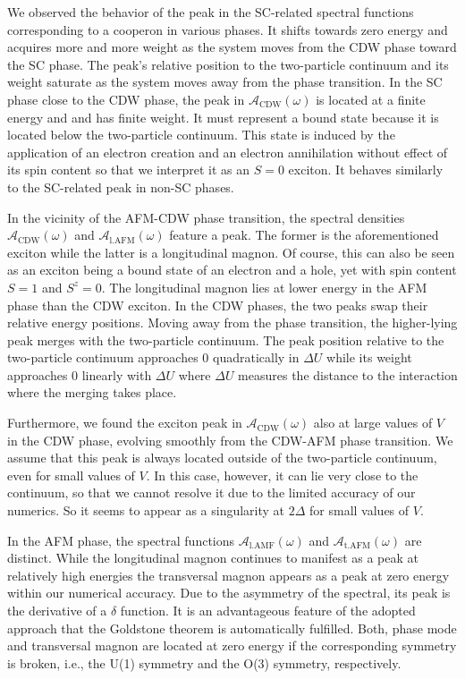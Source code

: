 \documentclass[
    reprint, 
    aps,
    preprintnumbers,
    twocolumn,
    prb,
    superscriptaddress
]{revtex4-2}
\newcommand{\spectral}[1]{\mathcal{A}_\text{#1}  (\omega)}
\begin{document}
We observed the behavior of the peak in the SC-related spectral functions corresponding to a cooperon in various phases. 
It shifts towards zero energy and acquires more and more weight as the system moves from the CDW phase toward the SC phase. 
The peak's relative position to the two-particle continuum and its weight saturate 
as the system moves away from the phase transition.
In the SC phase close to the CDW phase, the peak in $\spectral{CDW}$ 
is located at a finite energy and and has finite weight. 
It must represent a bound state because it is located below the two-particle continuum. 
This state is induced by the application of an electron creation and an electron annihilation without effect of its spin content so that we interpret it as an $S=0$ exciton.
It behaves similarly to the SC-related peak in non-SC phases.

In the vicinity of the AFM-CDW phase transition, the spectral densities
$\spectral{CDW}$ and $\spectral{l.AFM}$ feature a peak. 
The former is the aforementioned exciton while the latter is a longitudinal magnon. 
Of course, this can also be seen as an exciton being a bound
state of an electron and a hole, yet with spin content $S=1$ and $S^z=0$. 
The longitudinal magnon lies at lower energy in the AFM phase than the CDW exciton. 
In the CDW phases, the two peaks swap their relative energy positions. 
Moving away from the phase transition, the higher-lying peak merges with the two-particle continuum. 
The peak position relative to the two-particle continuum approaches $0$ 
quadratically in $\Delta U$ while its weight approaches $0$ linearly with $\Delta U$ where
$\Delta U$ measures the distance to the interaction where the merging takes place.

Furthermore, we found the exciton peak in $\spectral{CDW}$ also at large values of $V$ in the CDW phase, 
evolving smoothly from the CDW-AFM phase transition. 
We assume that this peak is always located outside of the two-particle continuum, even for small values of $V$.
In this case, however, it can lie very close to the continuum, so that we cannot resolve it due to the limited accuracy of our numerics.
So it seems to appear as a singularity at $2\Delta$ for small values of $V$.

In the AFM phase, the spectral functions $\spectral{l.AMF}$ and $\spectral{t.AFM}$ are distinct.
While the longitudinal magnon continues to manifest as a peak at relatively high energies
the transversal magnon appears as a peak at zero energy within our numerical accuracy. Due to
the asymmetry of the spectral, its peak is the derivative of a $\delta$ function.
It is an advantageous feature of the adopted approach that the Goldstone theorem is 
automatically fulfilled. Both, phase mode and transversal magnon are located at zero energy
if the corresponding symmetry is broken, i.e., the U(1) symmetry and the O(3) symmetry,
respectively.
\end{document}

